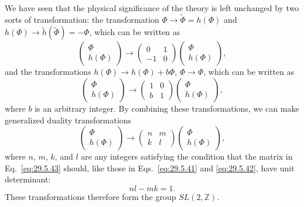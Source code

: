 We have seen that the physical significance of the theory is left unchanged
by two sorts of transformation: the transformation
\(\Phi\longrightarrow\widetilde\Phi=h(\Phi)\) and
\(h(\Phi)\longrightarrow\widetilde h(\widetilde\Phi)=-\Phi\), which can be
written as
\begin{equation}
  \begin{pmatrix}
    \Phi\\ h(\Phi)
  \end{pmatrix}
  \longrightarrow
  \begin{pmatrix}
    0&1\\ -1&0
  \end{pmatrix}
  \begin{pmatrix}
    \Phi\\ h(\Phi)
  \end{pmatrix},
  \tag{29.5.41}\label{eq:29.5.41}
\end{equation}
and the transformations
\(h(\Phi)\longrightarrow h(\Phi)+b\Phi\),
\(\Phi\longrightarrow\Phi\), which can be written as
\begin{equation}
  \begin{pmatrix}
    \Phi\\ h(\Phi)
  \end{pmatrix}
  \longrightarrow
  \begin{pmatrix}
    1&0\\ b&1
  \end{pmatrix}
  \begin{pmatrix}
    \Phi\\ h(\Phi)
  \end{pmatrix},
  \tag{29.5.42}\label{eq:29.5.42}
\end{equation}
where \(b\) is an arbitrary integer. By combining these transformations, we
can make generalized duality transformations
\begin{equation}
  \begin{pmatrix}
    \Phi\\ h(\Phi)
  \end{pmatrix}
  \longrightarrow
  \begin{pmatrix}
    n&m\\ k&l
  \end{pmatrix}
  \begin{pmatrix}
    \Phi\\ h(\Phi)
  \end{pmatrix},
  \tag{29.5.43}\label{eq:29.5.43}
\end{equation}
where \(n\), \(m\), \(k\), and \(l\) are any integers satisfying the
condition that the matrix in Eq.~\eqref{eq:29.5.43} should, like those in
Eqs.~\eqref{eq:29.5.41} and \eqref{eq:29.5.42}, have unit determinant:
\begin{equation}
  nl-mk=1.
  \tag{29.5.44}\label{eq:29.5.44}
\end{equation}
These transformations therefore form the group \(SL(2,\mathbb{Z})\).

